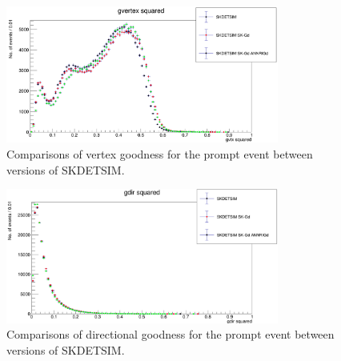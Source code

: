 \begin{figure}[htp]
    \centering
    \includegraphics[width=0.8\textwidth]{Figures/gvtx_squared.PNG}
    \caption{Comparisons of vertex goodness for the prompt event between versions of SKDETSIM.}
    \label{fig:gvtx_squared}

\end{figure}

\begin{figure}[htp]
    \centering
    \includegraphics[width=0.8\textwidth]{Figures/gdir_squared.PNG}
    \caption{Comparisons of directional goodness for the prompt event between versions of SKDETSIM.}
    \label{fig:gdir_squared}

\end{figure}

